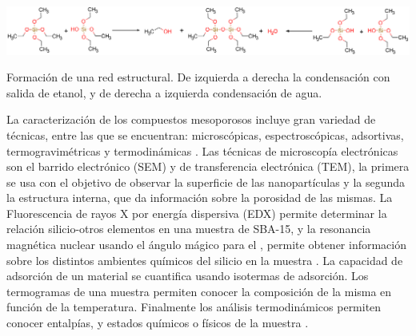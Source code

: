 \documentclass[fleqn,11pt]{SelfArx}
\begin{document}
	\begin{scheme*}[ht]
		\centering
		\includegraphics[width=\linewidth]{structures/polysilicate.png}
		\caption{Formaci\'on de una red estructural. De izquierda a derecha la condensaci\'on con salida de etanol, y de derecha a izquierda condensaci\'on de agua.}
		\label{sch: polysilicate}
	\end{scheme*}
	
	La caracterizaci\'on de los compuestos mesoporosos incluye gran variedad de t\'ecnicas, entre las que se encuentran: microsc\'opicas, espectrosc\'opicas, adsortivas, termogravim\'etricas y termodin\'amicas \cite{vargas_legnoverde_giraldo_basaldella_moreno-pirajan_2010}. Las t\'ecnicas de microscop\'ia electr\'onicas son el barrido electr\'onico (SEM) y de transferencia electr\'onica (TEM), la primera se usa con el objetivo de observar la superficie de las nanopart\'iculas y la segunda la estructura interna, que da informaci\'on sobre la porosidad de las mismas. La Fluorescencia de rayos X por energía dispersiva (EDX) permite determinar la relaci\'on silicio-otros elementos en una muestra de SBA-15, y la resonancia magn\'etica nuclear usando el \'angulo m\'agico para el , permite obtener informaci\'on sobre los distintos ambientes qu\'imicos del silicio en la muestra \cite{zhao_1998}. La capacidad de adsorci\'on de un material se cuantifica usando isotermas de adsorci\'on. Los termogramas de una muestra permiten conocer la composici\'on de la misma en funci\'on de la temperatura. Finalmente los an\'alisis termodin\'amicos permiten conocer entalp\'ias, y estados qu\'imicos o f\'isicos de la muestra \cite{vargas_legnoverde_giraldo_basaldella_moreno-pirajan_2010}.
	
\end{document}
